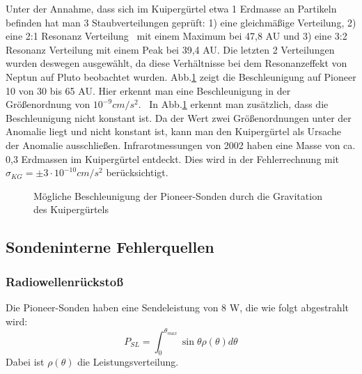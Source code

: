 Unter der Annahme, dass sich im Kuiperg\"urtel etwa 1 Erdmasse an
Partikeln befinden hat man 3 Staubverteilungen gepr\"uft: 1) eine
gleichm\"a{\ss}ige Verteilung, 2) eine 2:1 Resonanz Verteilung \ mit
einem Maximum bei 47,8 AU und 3) eine 3:2 Resonanz Verteilung mit einem
Peak bei 39,4 AU. Die letzten 2 Verteilungen wurden deswegen
ausgew\"ahlt, da diese Verh\"altnisse bei dem Resonanzeffekt von Neptun
auf Pluto beobachtet wurden. Abb.\ref{fig:kuiper} zeigt die Beschleunigung auf
Pioneer 10 von 30 bis 65 AU. Hier erkennt man eine Beschleunigung in der
Gr\"o{\ss}enordnung von $10^{-9}\mathit{cm}/s^{2}$. \ In Abb.\ref{fig:kuiper}
erkennt man zus\"atzlich, dass die Beschleunigung nicht konstant ist.
Da der Wert zwei Gr\"o{\ss}enordnungen unter der Anomalie liegt und
nicht konstant ist, kann man den Kuiperg\"urtel als Ursache der
Anomalie ausschlie{\ss}en. Infrarotmessungen von 2002 haben eine Masse
von ca. 0,3 Erdmassen im Kuiperg\"urtel entdeckt. Dies wird in der
Fehlerrechnung mit \ $\sigma _{\mathit{KG}}=\pm 3\cdot
10^{-10}\mathit{cm}/s^{2}$ ber\"ucksichtigt\cite{Anderson2002}.


\begin{figure}[htbn]
\begin{center}
\noindent    
{}
\end{center}
\vskip -10pt
  \caption{Mögliche Beschleunigung der Pioneer-Sonden durch die Gravitation des Kuipergürtels \cite{Anderson2002}}
\label{fig:kuiper}
\end{figure} 


\bigskip

\subsection{Sondeninterne Fehlerquellen}\label{intern}

\subsubsection{Radiowellenr\"ucksto{\ss}}

Die Pioneer-Sonden haben eine Sendeleistung von 8 W, die wie folgt
abgestrahlt wird:
\begin{equation}
P_{\mathit{SL}}=\int _{0}^{\theta _{\mathit{max}}}\sin \theta \rho
(\theta )d\theta
\end{equation}
Dabei ist $\rho (\theta )$ die Leistungsverteilung.

